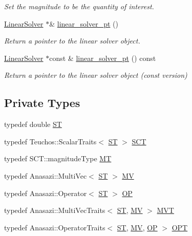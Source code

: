 \begin{DoxyCompactItemize}
\begin{DoxyCompactList}\small\item\em Set the magnitude to be the quantity of interest. \end{DoxyCompactList}\item 
\hyperlink{classoomph_1_1LinearSolver}{Linear\+Solver} $\ast$\& \hyperlink{classoomph_1_1ANASAZI_aaaab3d8263b5bdf21eef4aecdc3273c7}{linear\+\_\+solver\+\_\+pt} ()
\begin{DoxyCompactList}\small\item\em Return a pointer to the linear solver object. \end{DoxyCompactList}\item 
\hyperlink{classoomph_1_1LinearSolver}{Linear\+Solver} $\ast$const  \& \hyperlink{classoomph_1_1ANASAZI_a8abde7ddc8a5785c9db713c45ed61e24}{linear\+\_\+solver\+\_\+pt} () const
\begin{DoxyCompactList}\small\item\em Return a pointer to the linear solver object (const version) \end{DoxyCompactList}\end{DoxyCompactItemize}
\subsection*{Private Types}
\begin{DoxyCompactItemize}
\item 
typedef double \hyperlink{classoomph_1_1ANASAZI_a604b8dc6a0618d81dfce82849d5b47a7}{ST}
\item 
typedef Teuchos\+::\+Scalar\+Traits$<$ \hyperlink{classoomph_1_1ANASAZI_a604b8dc6a0618d81dfce82849d5b47a7}{ST} $>$ \hyperlink{classoomph_1_1ANASAZI_a1bb5eb9f072ed92f48fdd32ca22abd0e}{S\+CT}
\item 
typedef S\+C\+T\+::magnitude\+Type \hyperlink{classoomph_1_1ANASAZI_a8c8982a3b6f716d4ea9b497235351cf2}{MT}
\item 
typedef Anasazi\+::\+Multi\+Vec$<$ \hyperlink{classoomph_1_1ANASAZI_a604b8dc6a0618d81dfce82849d5b47a7}{ST} $>$ \hyperlink{classoomph_1_1ANASAZI_aa1922409eb193949b0cb4e89d43316ed}{MV}
\item 
typedef Anasazi\+::\+Operator$<$ \hyperlink{classoomph_1_1ANASAZI_a604b8dc6a0618d81dfce82849d5b47a7}{ST} $>$ \hyperlink{classoomph_1_1ANASAZI_ac89159c0da5e64ce641a2bcb8bd2d2be}{OP}
\item 
typedef Anasazi\+::\+Multi\+Vec\+Traits$<$ \hyperlink{classoomph_1_1ANASAZI_a604b8dc6a0618d81dfce82849d5b47a7}{ST}, \hyperlink{classoomph_1_1ANASAZI_aa1922409eb193949b0cb4e89d43316ed}{MV} $>$ \hyperlink{classoomph_1_1ANASAZI_a7c667c5531aff020a4dbd95f0cebba8b}{M\+VT}
\item 
typedef Anasazi\+::\+Operator\+Traits$<$ \hyperlink{classoomph_1_1ANASAZI_a604b8dc6a0618d81dfce82849d5b47a7}{ST}, \hyperlink{classoomph_1_1ANASAZI_aa1922409eb193949b0cb4e89d43316ed}{MV}, \hyperlink{classoomph_1_1ANASAZI_ac89159c0da5e64ce641a2bcb8bd2d2be}{OP} $>$ \hyperlink{classoomph_1_1ANASAZI_ab1bca328746775f4d6adcb6709afe57f}{O\+PT}
\end{DoxyCompactItemize}
